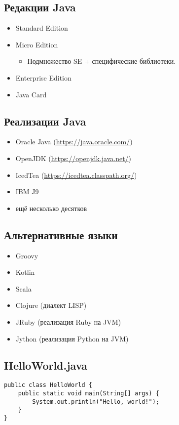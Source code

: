 \subsection{Редакции Java}
\begin{itemize}
    \item Standard Edition
    \item Micro Edition
    \begin{itemize}
        \item Подмножество SE + специфические библиотеки.
    \end{itemize}
    \item Enterprise Edition
    \item Java Card
\end{itemize}

\subsection{Реализации Java}
\begin{itemize}
    \item Oracle Java (\url{https://java.oracle.com/})
    \item OpenJDK (\url{https://openjdk.java.net/})
    \item IcedTea (\url{https://icedtea.classpath.org/})
    \item IBM J9
    \item ещё несколько десятков
\end{itemize}

\subsection{Альтернативные языки}
\begin{itemize}
    \item Groovy
    \item Kotlin
    \item Scala
    \item Clojure (диалект LISP)
    \item JRuby (реализация Ruby на JVM)
    \item Jython (реализация Python на JVM)
\end{itemize}

\subsection{HelloWorld.java}
\begin{verbatim}
public class HelloWorld {
    public static void main(String[] args) {
        System.out.println("Hello, world!");
    }
}
\end{verbatim}

